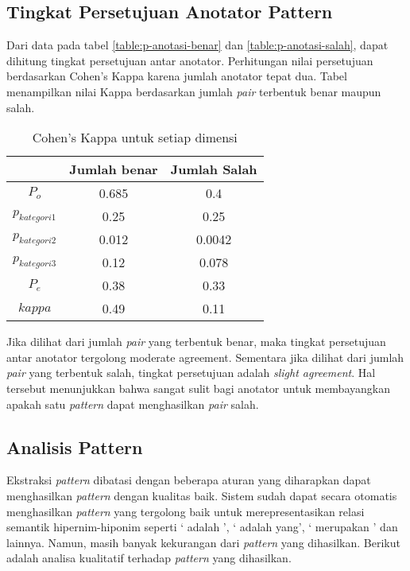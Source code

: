 \subsection{Tingkat Persetujuan Anotator Pattern}
Dari data pada tabel \ref{table:p-anotasi-benar} dan \ref{table:p-anotasi-salah}, dapat dihitung tingkat persetujuan antar anotator. Perhitungan nilai persetujuan berdasarkan Cohen's Kappa karena jumlah anotator tepat dua. Tabel menampilkan nilai Kappa berdasarkan jumlah \textit{pair} terbentuk benar maupun salah.

\begin{table}
  \centering
  \caption{Cohen's Kappa untuk setiap dimensi}
  \label{table:p-kappa}
  \begin{tabular}{|c|c|c|}
  \hline
  & Jumlah benar & Jumlah Salah \\ \hline
  $P_o$ & 0.685 & 0.4 \\ \hline
  $p_{kategori1}$ & 0.25 & 0.25 \\ \hline
  $p_{kategori2}$ & 0.012 & 0.0042 \\ \hline
  $p_{kategori3}$ & 0.12 & 0.078 \\ \hline
  $P_e$ & 0.38 & 0.33 \\ \hline
  $kappa$ & 0.49 & 0.11 \\ \hline 
  \end{tabular} 
\end{table}

Jika dilihat dari jumlah \textit{pair} yang terbentuk benar, maka tingkat persetujuan antar anotator tergolong {moderate agreement}. Sementara jika dilihat dari jumlah \textit{pair} yang terbentuk salah, tingkat persetujuan adalah \textit{slight agreement}. Hal tersebut menunjukkan bahwa sangat sulit bagi anotator untuk membayangkan apakah satu \textit{pattern} dapat menghasilkan \textit{pair} salah.

\subsection{Analisis Pattern}
Ekstraksi \textit{pattern} dibatasi dengan beberapa aturan yang diharapkan dapat menghasilkan \textit{pattern} dengan kualitas baik. Sistem sudah dapat secara otomatis menghasilkan \textit{pattern} yang tergolong baik untuk merepresentasikan relasi semantik hipernim-hiponim seperti `{\tagHyponym} adalah {\tagHypernym}', `{\tagHyponym} adalah {\tagHypernym} yang', `{\tagHyponym} merupakan {\tagHypernym}' dan lainnya. Namun, masih banyak kekurangan dari \textit{pattern} yang dihasilkan. Berikut adalah  analisa kualitatif terhadap \textit{pattern} yang dihasilkan.

